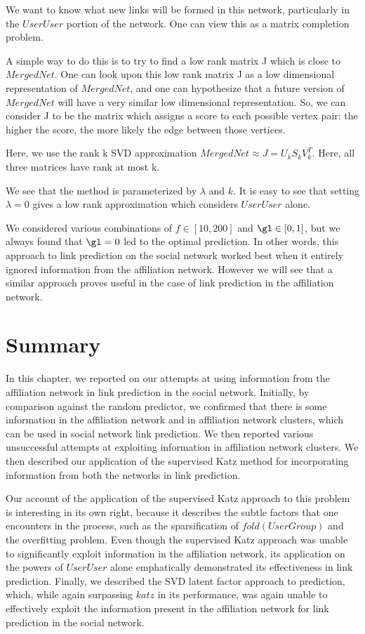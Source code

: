 \documentclass{report}
\begin{document}
We want to know what new links will be formed in this network, particularly in the $UserUser$ portion of the network. One can view this as a matrix completion problem.

A simple way to do this is to try to find a low rank matrix J which is close to $MergedNet$. One can look upon this low rank matrix J as a low dimensional representation of $MergedNet$, and one can hypothesize that a future version of $MergedNet$ will have a very similar low dimensional representation. So, we can consider J to be the matrix which assigns a score to each possible vertex pair: the higher the score, the more likely the edge between those vertices.

Here, we use the rank k SVD approximation $MergedNet \approx J = U_k S_k V_k^{T}$. Here, all three matrices have rank at most k.

We see that the method is parameterized by $\lambda$ and $k$. It is easy to see that setting $\lambda = 0$ gives a low rank approximation which considers $UserUser$ alone.

We considered various combinations of $f \in [10, 200]$ and $\gl \in [0,1]$, but we always found that $\gl = 0$ led to the optimal prediction. In other words, this approach to link prediction on the social network worked best when it entirely ignored information from the affiliation network. However we will see that a similar approach proves useful in the case of link prediction in the affiliation network.

\section{Summary}
In this chapter, we reported on our attempts at using information from the affiliation network in link prediction in the social network. Initially, by comparison against the random predictor, we confirmed that there is some information in the affiliation network and in affiliation network clusters, which can be used in social network link prediction. We then reported various unsuccessful attempts at exploiting information in affiliation network clusters. We then described our application of the supervised Katz method for incorporating information from both the networks in link prediction.

Our account of the application of the supervised Katz approach to this problem is interesting in its own right, because it describes the subtle factors that one encounters in the process, such as the sparsification of $fold(UserGroup)$ and the overfitting problem. Even though the supervised Katz approach was unable to significantly exploit information in the affiliation network, its application on the powers of $UserUser$ alone emphatically demonstrated its effectiveness in link prediction. Finally, we described the SVD latent factor approach to prediction, which, while again surpassing $katz$ in its performance, was again unable to effectively exploit the information present in the affiliation network for link prediction in the social network.
\end{document}
